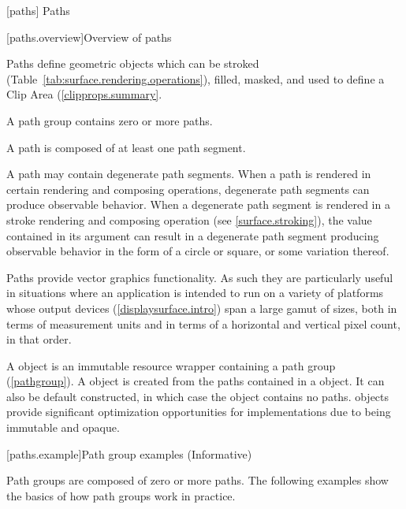 
 [paths] {Paths}

 [paths.overview]{Overview of paths}

\pnum
Paths define geometric objects which can be stroked (Table~\ref{tab:surface.rendering.operations}), filled, masked, and used to define a Clip Area (\ref{clipprops.summary}.

\pnum
A path group contains zero or more paths.

\pnum
A path is composed of at least one path segment.

\pnum
A path may contain degenerate path segments. When a path is rendered in certain rendering and composing operations, degenerate path segments can produce observable behavior.
\enterexample
When a degenerate path segment is rendered in a stroke rendering and composing operation (see \ref{surface.stroking}), the  value contained in its  argument can result in a degenerate path segment producing observable behavior in the form of a circle or square, or some variation thereof.
\exitexample

\pnum
Paths provide vector graphics functionality. As such they are particularly useful in situations where an application is intended to run on a variety of platforms whose output devices (\ref{displaysurface.intro}) span a large gamut of sizes, both in terms of measurement units and in terms of a horizontal and vertical pixel count, in that order.
%

\pnum
A  object is an immutable resource wrapper containing a path group (\ref{pathgroup}). A  object is created from the paths contained in a  object. It can also be default constructed, in which case the  object contains no paths.
\enternote
{} objects provide significant optimization opportunities for implementations due to being immutable and opaque.
\exitnote

 [paths.example]{Path group examples (Informative)}

\pnum
Path groups are composed of zero or more paths. The following examples show the basics of how path groups work in practice.

